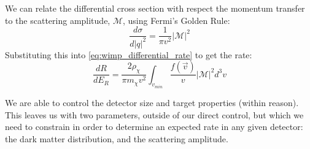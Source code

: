 \par 
We can relate the differential cross section with respect the momentum transfer to the scattering amplitude, $\mathcal{M}$, using Fermi's Golden Rule:
\begin{equation}
    \frac{d\sigma}{d|q|^2} = \frac{1}{\pi v^2} |\mathcal{M}|^2
    \label{eq:fermi_golden_rule_for_cross_section}
\end{equation}
Substituting this into \autoref{eq:wimp_differential_rate} to get the rate: 
\begin{equation}
    \frac{dR}{dE_R} = \frac{2\rho_{\chi}}{\pi m_{\chi} v^2} \int_{v_{min}} \frac{f(\vec{v})}{v} | \mathcal{M} |^2 d^3v
    \label{eq:wimp_differential_rate_scattering_amplitude}
\end{equation}
\par
We are able to control the detector size and target properties (within reason).
This leaves us with two parameters, outside of our direct control, but which we need to constrain in order to determine an expected rate in any given detector: the dark matter distribution, and the scattering amplitude.

